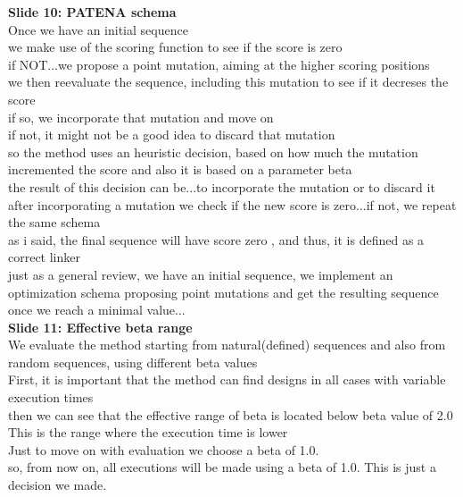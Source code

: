 \documentclass[a4paper,10pt]{article}
\begin{document}
\textbf{Slide 10: PATENA schema}\\
Once we have an initial sequence\\
we make use of the scoring function to see if the score is zero\\
if NOT...we propose a point mutation, aiming at the higher scoring positions\\
we then reevaluate the sequence, including this mutation to see if it decreses the score\\
if so, we incorporate that mutation and move on\\
if not, it might not be a good idea to discard that mutation\\
so the method uses an heuristic decision, based on how much the mutation incremented the score and also it is based on a parameter beta\\
the result of this decision can be...to incorporate the mutation or to discard it\\
after incorporating a mutation we check if the new score is zero...if not, we repeat the same schema\\
as i said, the final sequence will have score zero , and thus, it is defined as a correct linker\\
just as a general review, we have an initial sequence, we implement an optimization schema proposing point mutations and get the resulting sequence once we reach a minimal value...\\


\textbf{Slide 11: Effective beta range}\\
We evaluate the method starting from natural(defined) sequences and also from random sequences, using different beta values\\
First, it is important that the method can find designs in all cases with variable execution times\\
then we can see that the effective range of beta is located below beta value of 2.0\\
This is the range where the execution time is lower\\
Just to move on with evaluation we choose a beta of 1.0.\\
so, from now on, all executions will be made using a beta of 1.0. This is just a decision we made.\\
\end{document}
